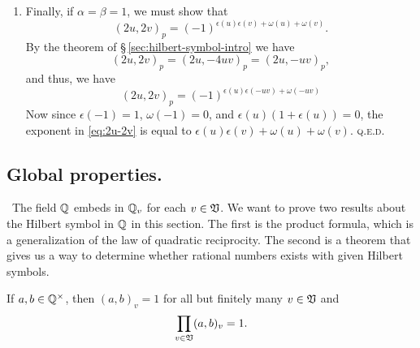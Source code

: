 \begin{enumerate}[nosep, label=(\roman*), wide]
    \item Finally, if \(\alpha = \beta = 1\), we must show that
    \[
    (2u, 2v)_p = (-1)^{\epsilon(u)\epsilon(v) + \omega(u) + \omega(v)}.
    \]
    By the theorem of \S\,\ref{sec:hilbert-symbol-intro} we have
    \[
    (2u, 2v)_p = (2u, -4uv)_p = (2u, -uv)_p,
    \]
    and thus, we have
    \begin{equation}
    (2u, 2v)_p = (-1)^{\epsilon(u)\epsilon(-uv) + \omega(-uv)}
    \label{eq:2u-2v}
    \end{equation}
    Now since \(\epsilon(-1) = 1\), \(\omega(-1) = 0\), and \(\epsilon(u) (1 + \epsilon(u)) = 0\), the exponent in \eqref{eq:2u-2v} is equal to \(\epsilon(u)\epsilon(v) + \omega(u) + \omega(v)\). \scshape{q.e.d.}
\end{enumerate}




\subsection{Global properties.}\label{sec:hilbert-reciprocity}~The field \(\mathbb{Q}\) embeds in \(\mathbb{Q}_v\) for each \(v \in \mathfrak{V}\). We want to prove two results about the Hilbert symbol in \(\mathbb{Q}\) in this section. The first is the product formula, which is a generalization of the law of quadratic reciprocity. The second is a theorem that gives us a way to determine whether rational numbers exists with given Hilbert symbols.

\begin{theoremx}
    If \(a, b \in \mathbb{Q}^{\times}\), then \((a, b)_v = 1\) for all but finitely many \(v \in \mathfrak{V}\) and 
    \[
        \prod_{v \in \mathfrak{V}} (a, b)_v = 1.
    \]
\end{theoremx}

